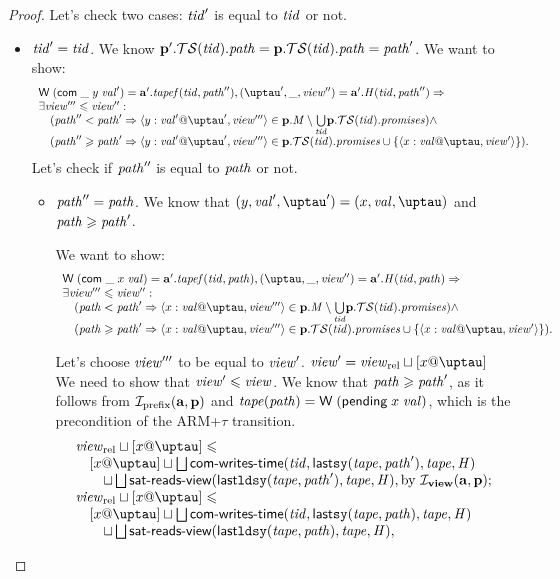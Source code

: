 \begin{proof}
  Let's check two cases: $\mathit{tid}'$ is equal to $\mathit{tid}$ or not.
  \begin{itemize}
    \item $\mathit{tid}' = \mathit{tid}$.
    We know $\mathbf{p}'.\mathcal{TS}(\mathit{tid}).\mathit{path} = \mathbf{p}.\mathcal{TS}(\mathit{tid}).\mathit{path} = \mathit{path}'$.
    We want to show:
    \[\begin{array}{l}
    \tapeWrite{(\tapeWriteCommitted{\_}{y}{\stval'})} = \aT'.\tapef(\tId, \cpath''),
       (\tau', \_, \R'') = \aT'.\hmap(\tId, \cpath'') => \\
    \exists \R''' \le \R'': \\
    \quad (\cpath'' <   \cpath' => \writeEvt{y}{\stval'}{\tau'}{\R'''}
               \in \p.\Mprom \setminus \underset{\tId}{\bigcup} \p.\TSfprom(\tId).\PromSet) \land \\
    \quad (\cpath'' \ge \cpath' => \writeEvt{y}{\stval'}{\tau'}{\R'''}
               \in \p.\TSfprom(\tId).\PromSet \cup \{\writeEvt{x}{\stval}{\tau}{\R'}\}).\\
    \end{array}\]
    Let's check if $\mathit{path}''$ is equal to $\mathit{path}$ or not.
    \begin{itemize}
      \item $\mathit{path}'' = \mathit{path}$. We know that $(y, \stval', \tau') = (x, \stval, \tau)$ and $\mathit{path} \geqslant \mathit{path}'$.

        We want to show:
    \[\begin{array}{l}
    \tapeWrite{(\tapeWriteCommitted{\_}{x}{\stval})} = \aT'.\tapef(\tId, \cpath),
       (\tau, \_, \R'') = \aT'.\hmap(\tId, \cpath) => \\
    \exists \R''' \le \R'': \\
    \quad (\cpath <   \cpath' => \writeEvt{x}{\stval}{\tau}{\R'''}
               \in \p.\Mprom \setminus \underset{\tId}{\bigcup} \p.\TSfprom(\tId).\PromSet) \land \\
    \quad (\cpath \ge \cpath' => \writeEvt{x}{\stval}{\tau}{\R'''}
               \in \p.\TSfprom(\tId).\PromSet \cup \{\writeEvt{x}{\stval}{\tau}{\R'}\}).\\
    \end{array}\]

      Let's choose $\mathit{view}'''$ to be equal to $\mathit{view}'$. $\R' = \Rrel \sqcup [x @ \tau]$ We need to show that $\mathit{view}' \leqslant \mathit{view}$.
We know that $\mathit{path} \geqslant \mathit{path}'$, as it follows from
$\mathcal{I}_{\textup{\rm prefix}}(\mathbf{a}, \mathbf{p})$ and $\mathit{tape}(\mathit{path}) = \textsf{W} \; (\textsf{pending} \; x \; \mathit{val})$,
which is the precondition of the ARM+$\tau$  transition.
\[
\begin{array}{l}
\Rrel \sqcup [x @ \tau] \le\\
\quad [x @ \tau] \sqcup \bigsqcup \opstau(\tId, \lastSY(\tape, \cpath'), \tape, \hmap) \\
\quad \quad      \sqcup \bigsqcup \readsSatisfiedR(\lastLDSY(\tape, \cpath'), \tape, \hmap),
\text{by } \invView(\aT, \p); \\
\Rrel \sqcup [x @ \tau] \le\\
\quad [x @ \tau] \sqcup \bigsqcup \opstau(\tId, \lastSY(\tape, \cpath), \tape, \hmap) \\
\quad \quad      \sqcup \bigsqcup \readsSatisfiedR(\lastLDSY(\tape, \cpath), \tape, \hmap),


\end{array}\]
\end{itemize}
\end{itemize}
\end{proof}
